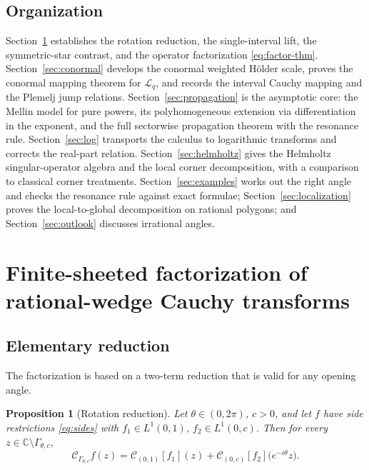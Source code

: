 \documentclass[pdflatex,sn-mathphys-num]{sn-jnl}%
\newcommand{\C}{\mathbb{C}}
\newcommand{\Cau}{\mathcal{C}}
\newcommand{\Gw}{\Gamma_{\theta,c}}
\newcommand{\Lq}{\mathcal{L}_{q}}
\theoremstyle{thmstyleone}
\newtheorem{proposition}[theorem]{Proposition}%
\theoremstyle{thmstyletwo}
\theoremstyle{thmstylethree}
\begin{document}
\subsection{Organization}
Section~\ref{sec:factor} establishes the rotation reduction, the single-interval
lift, the symmetric-star contrast, and the operator factorization
\eqref{eq:factor-thm}. Section~\ref{sec:conormal} develops the conormal weighted
H\"older scale, proves the conormal mapping theorem for $\Lq$, and records the
interval Cauchy mapping and the Plemelj jump relations.
Section~\ref{sec:propagation} is the asymptotic core: the Mellin model for pure
powers, its polyhomogeneous extension via differentiation in the exponent, and
the full sectorwise propagation theorem with the resonance rule.
Section~\ref{sec:log} transports the calculus to logarithmic transforms and
corrects the real-part relation. Section~\ref{sec:helmholtz} gives the Helmholtz
singular-operator algebra and the local corner decomposition, with a comparison
to classical corner treatments. Section~\ref{sec:examples} works out the right
angle and checks the resonance rule against exact formulae;
Section~\ref{sec:localization} proves the local-to-global decomposition on
rational polygons; and Section~\ref{sec:outlook} discusses irrational angles.
\section{Finite-sheeted factorization of rational-wedge Cauchy transforms}
\label{sec:factor}

\subsection{Elementary reduction}
The factorization is based on a two-term reduction that is valid for any opening angle.

\begin{proposition}[Rotation reduction]\label{prop:reduction}
Let $\theta\in(0,2\pi)$, $c>0$, and let $f$ have side restrictions
\eqref{eq:sides} with $f_1\in L^1(0,1)$, $f_2\in L^1(0,c)$. Then for every
$z\in\C\setminus\Gw$,
\begin{equation}\label{eq:reduction}
  \Cau_{\Gw}f(z)=\Cau_{(0,1)}[f_1](z)+\Cau_{(0,c)}[f_2]\!\bigl(e^{-i\theta}z\bigr).
\end{equation}
\end{proposition}
\end{document}

